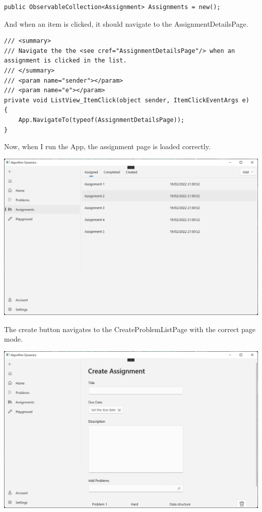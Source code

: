 \documentclass[a4paper]{report}
\begin{document}
\begin{verbatim}
public ObservableCollection<Assignment> Assignments = new();
\end{verbatim}

And when an item is clicked, it should navigate to the AssignmentDetailsPage.

\begin{verbatim}
/// <summary>
/// Navigate the the <see cref="AssignmentDetailsPage"/> when an assignment is clicked in the list.
/// </summary>
/// <param name="sender"></param>
/// <param name="e"></param>
private void ListView_ItemClick(object sender, ItemClickEventArgs e)
{
    App.NavigateTo(typeof(AssignmentDetailsPage));
}
\end{verbatim}

Now, when I run the App, the assignment page is loaded correctly.

\includegraphics[width=\textwidth, height=\textheight, keepaspectratio]{AssignmentsPage-Layout}

The create button navigates to the CreateProblemListPage with the correct page mode.

\includegraphics[width=\textwidth, height=\textheight, keepaspectratio]{AssignmentsPage-Create}
\end{document}
